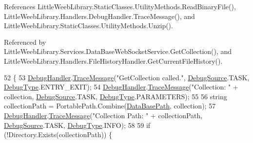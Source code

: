 References Little\+Weeb\+Library.\+Static\+Classes.\+Utility\+Methods.\+Read\+Binary\+File(), Little\+Weeb\+Library.\+Handlers.\+Debug\+Handler.\+Trace\+Message(), and Little\+Weeb\+Library.\+Static\+Classes.\+Utility\+Methods.\+Unzip().



Referenced by Little\+Weeb\+Library.\+Services.\+Data\+Base\+Web\+Socket\+Service.\+Get\+Collection(), and Little\+Weeb\+Library.\+Handlers.\+File\+History\+Handler.\+Get\+Current\+File\+History().


\begin{DoxyCode}
52         \{
53             \mbox{\hyperlink{class_little_weeb_library_1_1_handlers_1_1_data_base_handler_aa474a1f934032623ffb3ae5eb156148b}{DebugHandler}}.\mbox{\hyperlink{interface_little_weeb_library_1_1_handlers_1_1_i_debug_handler_a2e405bc3492e683cd3702fae125221bc}{TraceMessage}}(\textcolor{stringliteral}{"GetCollection called."}, 
      \mbox{\hyperlink{namespace_little_weeb_library_1_1_handlers_a2a6ca0775121c9c503d58aa254d292be}{DebugSource}}.TASK, \mbox{\hyperlink{namespace_little_weeb_library_1_1_handlers_ab66019ed40462876ec4e61bb3ccb0a62}{DebugType}}.ENTRY\_EXIT);
54             \mbox{\hyperlink{class_little_weeb_library_1_1_handlers_1_1_data_base_handler_aa474a1f934032623ffb3ae5eb156148b}{DebugHandler}}.\mbox{\hyperlink{interface_little_weeb_library_1_1_handlers_1_1_i_debug_handler_a2e405bc3492e683cd3702fae125221bc}{TraceMessage}}(\textcolor{stringliteral}{"Collection: "} + collection, 
      \mbox{\hyperlink{namespace_little_weeb_library_1_1_handlers_a2a6ca0775121c9c503d58aa254d292be}{DebugSource}}.TASK, \mbox{\hyperlink{namespace_little_weeb_library_1_1_handlers_ab66019ed40462876ec4e61bb3ccb0a62}{DebugType}}.PARAMETERS);
55 
56             \textcolor{keywordtype}{string} collectionPath = PortablePath.Combine(\mbox{\hyperlink{class_little_weeb_library_1_1_handlers_1_1_data_base_handler_aeea801d75a8294727c8b8e2805b43abb}{DataBasePath}}, collection);
57             \mbox{\hyperlink{class_little_weeb_library_1_1_handlers_1_1_data_base_handler_aa474a1f934032623ffb3ae5eb156148b}{DebugHandler}}.\mbox{\hyperlink{interface_little_weeb_library_1_1_handlers_1_1_i_debug_handler_a2e405bc3492e683cd3702fae125221bc}{TraceMessage}}(\textcolor{stringliteral}{"Collection Path: "} + collectionPath, 
      \mbox{\hyperlink{namespace_little_weeb_library_1_1_handlers_a2a6ca0775121c9c503d58aa254d292be}{DebugSource}}.TASK, \mbox{\hyperlink{namespace_little_weeb_library_1_1_handlers_ab66019ed40462876ec4e61bb3ccb0a62}{DebugType}}.INFO);
58 
59             \textcolor{keywordflow}{if} (!Directory.Exists(collectionPath)) \{

\end{DoxyCode}

